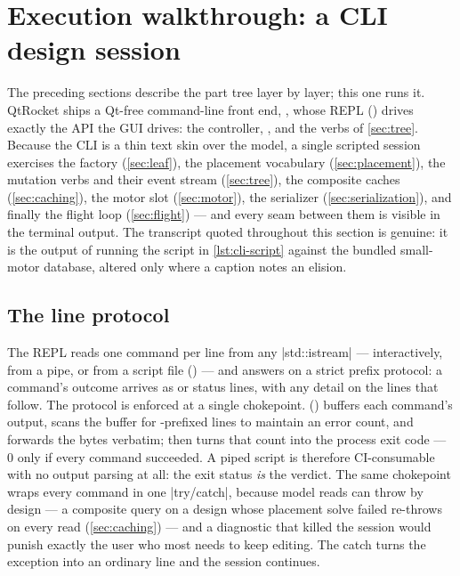 \section{Execution walkthrough: a CLI design session}\label{sec:cli}

The preceding sections describe the part tree layer by layer; this one runs it. QtRocket ships a
Qt-free command-line front end, , whose REPL () drives exactly
the API the GUI drives: the  controller, , and the
 verbs of \cref{sec:tree}. Because the CLI is a thin text skin over the model, a
single scripted session exercises the factory (\cref{sec:leaf}), the placement vocabulary
(\cref{sec:placement}), the mutation verbs and their event stream (\cref{sec:tree}), the composite
caches (\cref{sec:caching}), the motor slot (\cref{sec:motor}), the serializer
(\cref{sec:serialization}), and finally the flight loop (\cref{sec:flight}) --- and every seam
between them is visible in the terminal output. The transcript quoted throughout this section is
genuine: it is the output of  running the script in
\cref{lst:cli-script} against the bundled small-motor database, altered only where a caption
notes an elision.

\subsection{The line protocol}\label{sec:cli-protocol}

The REPL reads one command per line from any \cppinline|std::istream| --- interactively, from a
pipe, or from a script file () --- and answers on a strict prefix protocol:
a command's outcome arrives as  or  status lines, with any detail on the lines
that follow.
The protocol is enforced at a single chokepoint.  ()
buffers each command's output, scans the buffer for -prefixed lines to maintain an error
count, and forwards the bytes verbatim;  then turns that count into the process exit code
--- $0$ only if every command succeeded. A piped script is therefore CI-consumable with no output
parsing at all: the exit status \emph{is} the verdict. The same chokepoint wraps every command in
one \cppinline|try/catch|, because model reads can throw by design --- a composite query on a
design whose placement solve failed re-throws on every read (\cref{sec:caching}) --- and a
diagnostic that killed the session would punish exactly the user who most needs to keep editing.
The catch turns the exception into an ordinary  line and the session continues.

